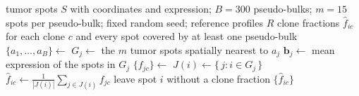 \documentclass[11pt]{article}
\begin{document}
\begin{algorithm}[h]
\caption{\textbf{Pseudo-bulk construction and spot-level clone fractions.} Builds spatially local pseudo-bulks for MIMO and maps the inferred clone fractions back to individual spots.}
\begin{algorithmic}
\Require tumor spots $S$ with coordinates and expression; $B = 300$ pseudo-bulks; $m = 15$ spots per pseudo-bulk; fixed random seed; reference profiles $R$
\Ensure clone fractions $\hat{f}_{ic}$ for each clone $c$ and every spot covered by at least one pseudo-bulk
  \State $\{a_1,\dots,a_B\} \gets$  
    \State $G_j \gets$ the $m$ tumor spots spatially nearest to $a_j$
    \State $\mathbf{b}_j \gets$ mean expression of the spots in $G_j$
  \EndFor
  \State $\{f_{jc}\} \gets$  
    \State $J(i) \gets \{\, j : i \in G_j \,\}$
        \State $\hat{f}_{ic} \gets \frac{1}{|J(i)|}\sum_{j \in J(i)} f_{jc}$ 
      \EndFor
    \Else
      \State leave spot $i$ without a clone fraction
    \EndIf
  \EndFor
  \State \Return $\{\hat{f}_{ic}\}$
\EndFunction
\end{algorithmic}
\end{algorithm}
\end{document}
